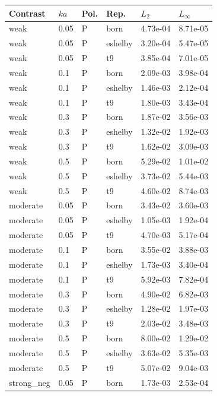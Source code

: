 \begin{tabular}{llllll}
\toprule
Contrast & $ka$ & Pol. & Rep. & $L_2$ & $L_\infty$ \\
\midrule
weak & 0.05 & P & born & 4.73e-04 & 8.71e-05 \\
weak & 0.05 & P & eshelby & 3.20e-04 & 5.47e-05 \\
weak & 0.05 & P & t9 & 3.85e-04 & 7.01e-05 \\
weak & 0.1 & P & born & 2.09e-03 & 3.98e-04 \\
weak & 0.1 & P & eshelby & 1.46e-03 & 2.12e-04 \\
weak & 0.1 & P & t9 & 1.80e-03 & 3.43e-04 \\
weak & 0.3 & P & born & 1.87e-02 & 3.56e-03 \\
weak & 0.3 & P & eshelby & 1.32e-02 & 1.92e-03 \\
weak & 0.3 & P & t9 & 1.62e-02 & 3.09e-03 \\
weak & 0.5 & P & born & 5.29e-02 & 1.01e-02 \\
weak & 0.5 & P & eshelby & 3.73e-02 & 5.44e-03 \\
weak & 0.5 & P & t9 & 4.60e-02 & 8.74e-03 \\
moderate & 0.05 & P & born & 3.43e-02 & 3.60e-03 \\
moderate & 0.05 & P & eshelby & 1.05e-03 & 1.92e-04 \\
moderate & 0.05 & P & t9 & 4.70e-03 & 5.17e-04 \\
moderate & 0.1 & P & born & 3.55e-02 & 3.88e-03 \\
moderate & 0.1 & P & eshelby & 1.73e-03 & 3.40e-04 \\
moderate & 0.1 & P & t9 & 5.92e-03 & 7.82e-04 \\
moderate & 0.3 & P & born & 4.90e-02 & 6.82e-03 \\
moderate & 0.3 & P & eshelby & 1.28e-02 & 1.97e-03 \\
moderate & 0.3 & P & t9 & 2.03e-02 & 3.48e-03 \\
moderate & 0.5 & P & born & 8.00e-02 & 1.29e-02 \\
moderate & 0.5 & P & eshelby & 3.63e-02 & 5.35e-03 \\
moderate & 0.5 & P & t9 & 5.07e-02 & 9.04e-03 \\
strong\_neg & 0.05 & P & born & 1.73e-03 & 2.53e-04 \\

\end{tabular}
